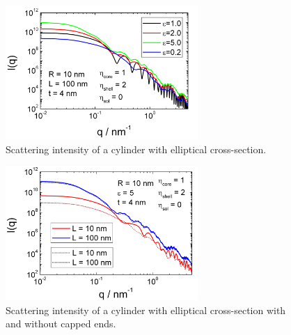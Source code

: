 \begin{figure}[htb]
\begin{center}
\includegraphics[width=0.65\textwidth]{../images/form_factor/cylindrical_obj/ellCylShell1.png}
\end{center}
\caption{Scattering intensity of a cylinder with elliptical cross-section.}
\label{fig:ellCylShell1}
\end{figure}

\begin{figure}[htb]
\begin{center}
\includegraphics[width=0.65\textwidth]{../images/form_factor/cylindrical_obj/ellCylShell1_2.png}
\end{center}
\caption{Scattering intensity of a cylinder with elliptical cross-section with and without capped ends.}
\label{fig:ellCylShell1_2}
\end{figure}

\vspace{5mm}

